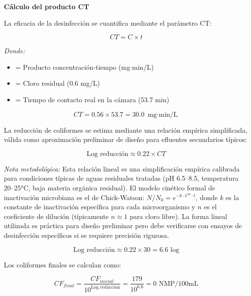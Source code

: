 \documentclass[12pt,a4paper]{article}
\begin{document}
\textbf{Cálculo del producto CT}

La eficacia de la desinfección se cuantifica mediante el parámetro CT:

\begin{equation}
CT = C \times t
\end{equation}

\textit{Donde:}
\begin{itemize}[noitemsep,leftmargin=2em]
    \item[$CT$] = Producto concentración-tiempo (mg$\cdot$min/L)
    \item[$C$] = Cloro residual (0.6 mg/L)
    \item[$t$] = Tiempo de contacto real en la cámara (53.7 min)
\end{itemize}

\begin{equation}
CT = 0.56 \times 53.7 = 30.0 \text{ mg$\cdot$min/L}
\end{equation}

La reducción de coliformes se estima mediante una relación empírica simplificada, válida como aproximación preliminar de diseño para efluentes secundarios típicos:

\begin{equation}
\text{Log reducción} \approx 0.22 \times CT
\end{equation}

\textit{Nota metodológica:} Esta relación lineal es una simplificación empírica calibrada para condiciones típicas de aguas residuales tratadas (pH 6.5--8.5, temperatura 20--25°C, baja materia orgánica residual). El modelo cinético formal de inactivación microbiana es el de Chick-Watson: $N/N_0 = e^{-k \cdot C^n \cdot t}$, donde $k$ es la constante de inactivación específica para cada microorganismo y $n$ es el coeficiente de dilución (típicamente $n \approx 1$ para cloro libre). La forma lineal utilizada es práctica para diseño preliminar pero debe verificarse con ensayos de desinfección específicos si se requiere precisión rigurosa.

\begin{equation}
\text{Log reducción} \approx 0.22 \times 30 = 6.6 \text{ log}
\end{equation}

Los coliformes finales se calculan como:

\begin{equation}
CF_{final} = \frac{CF_{inicial}}{10^{\text{Log reduccion}}} = \frac{179}{10^{6.6}} = 0 \text{ NMP/100mL}
\end{equation}
\end{document}

